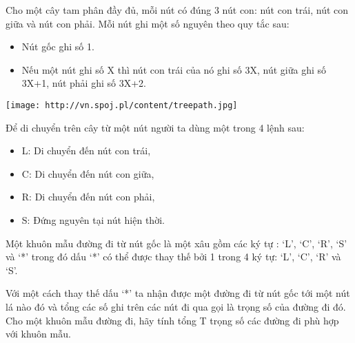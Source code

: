 Cho một cây tam phân đầy đủ, mỗi nút có đúng 3 nút con: nút con trái, nút con giữa và nút con phải. Mỗi nút ghi một số nguyên theo quy tắc sau:  
\begin{itemize}
	\item     Nút gốc ghi số 1.   
	\item     Nếu một nút ghi số X thì nút con trái của nó ghi số 3X, nút giữa ghi số 3X+1, nút phải ghi số 3X+2.   
\end{itemize}
\texttt{[image: http://vn.spoj.pl/content/treepath.jpg]}

   Để di chuyển trên cây từ một nút người ta dùng một trong 4 lệnh sau:  
\begin{itemize}
	\item     L: Di chuyển đến nút con trái,   
	\item     C: Di chuyển đến nút con giữa,   
	\item     R: Di chuyển đến nút con phải,   
	\item     S: Đứng nguyên tại nút hiện thời.   
\end{itemize}

   Một khuôn mẫu đường đi từ nút gốc là một xâu gồm các ký tự : ‘L’, ‘C’, ‘R’, ‘S’ và ‘*’ trong đó dấu ‘*’ có thể được thay thế bởi 1 trong 4 ký tự: ‘L’, ‘C’, ‘R’ và ‘S’.  

   Với một cách thay thế dấu ‘*’ ta nhận được một đường đi từ nút gốc tới một nút lá nào đó và tổng các số ghi trên các nút đi qua gọi là trọng số của đường đi đó.
Cho một khuôn mẫu đường đi, hãy tính tổng T trọng số các đường đi phù hợp với khuôn mẫu.